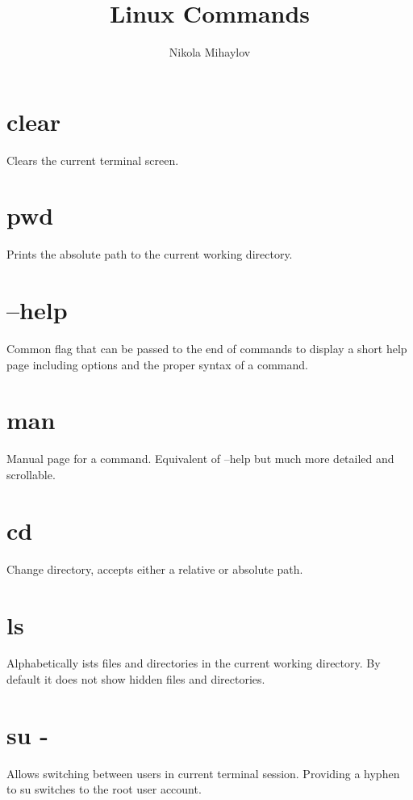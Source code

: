 \documentclass[]{article}
\title{Linux Commands}
\author{Nikola Mihaylov}
\begin{document}
\maketitle

\section{clear}

Clears the current terminal screen.

\section{pwd}

Prints the absolute path to the current working directory.

\section{--help}

Common flag that can be passed to the end of commands to display a short help page including options and the proper syntax of a command.

\section{man}

Manual page for a command. Equivalent of --help but much more detailed and scrollable.

\section{cd}

Change directory, accepts either a relative or absolute path.

\section{ls}

Alphabetically ists files and directories in the current working directory. By default it does not show hidden files and directories.

\section{su -}

Allows switching between users in current terminal session. Providing a hyphen to su switches to the root user account.
\end{document}
